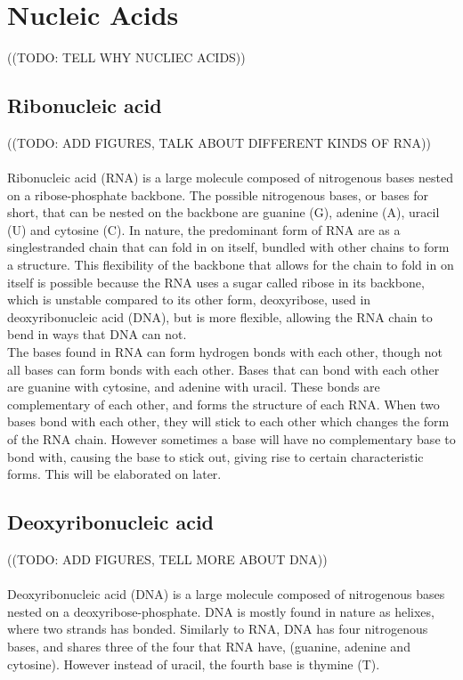 \section{Nucleic Acids}
((TODO: TELL WHY NUCLIEC ACIDS))
\subsection{Ribonucleic acid} %
((TODO: ADD FIGURES, TALK ABOUT DIFFERENT KINDS OF RNA))\\\\
Ribonucleic acid (RNA) is a large molecule composed of nitrogenous 
bases nested on a ribose-phosphate backbone. The possible nitrogenous bases, or 
bases for short, 
that can be nested on the backbone are guanine (G), adenine (A), uracil (U) and cytosine 
(C). In nature, the predominant form of RNA are as a singlestranded chain 
that can fold in on itself, bundled with other chains to form a structure. 
This flexibility of the backbone that allows for the chain to fold in on itself 
is possible because the RNA uses a sugar called ribose in its backbone, 
which is unstable compared to its other form, deoxyribose, used in 
deoxyribonucleic acid (DNA), but is more flexible, allowing the RNA chain to 
bend in ways that DNA can not.\\

The bases found in RNA can form hydrogen bonds with each other, though not all 
bases can form bonds with each other. Bases that can bond with each other are 
guanine with cytosine, and adenine with uracil. These bonds are complementary 
of each other, and forms the structure of each RNA. When 
two bases bond with each other, they will stick to each other 
which changes the form of the RNA chain. However sometimes a base will have no 
complementary base to bond with, causing the base to stick out, giving rise to 
certain characteristic forms. This will be elaborated on later.

\subsection{Deoxyribonucleic acid}
((TODO: ADD FIGURES, TELL MORE ABOUT DNA))\\\\
Deoxyribonucleic acid (DNA) is a large molecule composed of nitrogenous bases 
nested on a deoxyribose-phosphate. DNA is mostly found in nature as helixes, 
where two strands has bonded. Similarly to RNA, DNA has four nitrogenous 
bases, and shares three of the four that RNA have, (guanine, adenine and cytosine). 
However instead of uracil, the fourth base is thymine (T). 

